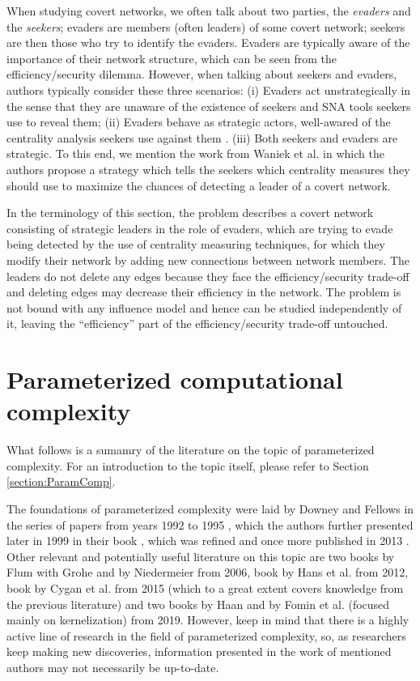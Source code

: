When studying covert networks, we often talk about two parties, the \emph{evaders} and the \emph{seekers};
evaders are members (often leaders) of some covert network;
seekers are then those who try to identify the evaders.
Evaders are typically aware of the importance of their network structure, which can be seen from
the efficiency/security dilemma.
However, when talking about seekers and evaders, authors typically consider these three scenarios:
(i) Evaders act unstrategically in the sense that they are unaware of
the existence of seekers and SNA tools seekers use to reveal them;
(ii) Evaders behave as strategic actors, well-awared of the centrality analysis
seekers use against them \cite{Waniek2017,Dey2019,Waniek2016,Dey2020}.
(iii) Both seekers and evaders are strategic.
To this end, we mention the work from Waniek et al. \cite{Waniek2021} in which the authors propose a strategy
which tells the seekers which centrality measures they should use
to maximize the chances of detecting a leader of a covert network.

In the terminology of this section, the \HL problem describes a covert network consisting of strategic leaders
in the role of evaders, which are trying to evade being detected by the use of centrality measuring techniques,
for which they modify their network by adding new connections between network members.
The leaders do not delete any edges because they face the efficiency/security trade-off and
deleting edges may decrease their efficiency in the network.
The problem is not bound with any influence model and hence can be studied independently of it,
leaving the ``efficiency'' part of the efficiency/security trade-off untouched.


\section{Parameterized computational complexity}\label{section:litRev:ParamCompl}

What follows is a sumamry of the literature on the topic of parameterized complexity.
For an introduction to the topic itself, please refer to Section \ref{section:ParamComp}.

The foundations of parameterized complexity were laid by Downey and Fellows
in the series of papers from years 1992 to 1995 \cite{Downey1995.1,Downey1995.2,Downey1993,Downey1995.4},
which the authors further presented later in 1999 in their book \cite{Downey1999},
which was refined and once more published in 2013 \cite{Downey2013}.
Other relevant and potentially useful literature on this topic are
two books by Flum with Grohe \cite{Flum2006} and by Niedermeier \cite{Niedermeier2006} from 2006, book by Hans et al. \cite{Hans2012} from 2012,
book by Cygan et al. \cite{Cygan2015} from 2015 (which to a great extent covers knowledge from the previous literature)
and two books by Haan \cite{Haan2019} and by Fomin et al. (focused mainly on kernelization) \cite{Fomin2019} from 2019.
However, keep in mind that there is a highly active line of research in the field of parameterized complexity, so,
as researchers keep making new discoveries, information presented in the work of mentioned authors may not necessarily be up-to-date.
